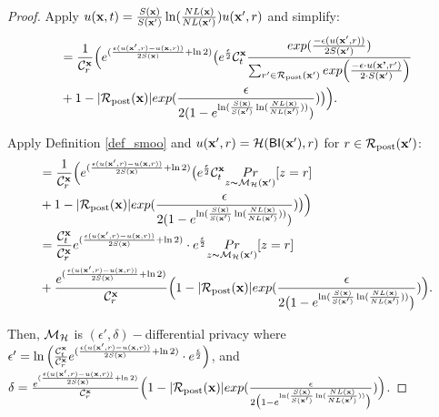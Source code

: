 \documentclass{article}
\begin{document}
\begin{proof}
      Apply $u(\textbf{x}, {t}) = \frac{S(\textbf{x})}{S(\textbf{x}')} \ln(\frac{NL(\textbf{x})}{NL(\textbf{x}')}) u(\textbf{x}', {r})$ and simplify:\\
      \begin{equation*}
      \begin{split}          
      & = \frac{1}{\mathcal{C}^{\textbf{x}}_{r}} \Big( e^{(\frac{\epsilon (u(\textbf{x}', {r}) - u(\textbf{x}, {r}))}{2 S(\textbf{x})} + \ln 2)} 
      \big( e^{\frac{\epsilon}{2}}
      \mathcal{C}^{\textbf{x}}_{t} \frac{exp(\frac{-\epsilon (u(\textbf{x}', {r}))}{2 S(\textbf{x}')})}{\sum_{r'\in \mathcal{R}_{\textup{post}}(\textbf{x}')} exp \Big(\frac{-\epsilon\cdot u(\textbf{\textbf{x}'}, r')}{2 \cdot S(\textbf{x}')}\Big)}\\
      & + 1 - |\mathcal{R}_{\textup{post}}(\textbf{x})|exp(\frac{\epsilon}{2 (1 - e ^ {\ln(\frac{S(\textbf{x})}{S(\textbf{x}')} \ln(\frac{NL(\textbf{x})}{NL(\textbf{x}')}))})}) 
      \big ) \Big).
       \end{split}
      \end{equation*}

      Apply Definition \ref{def_smoo} and $u(\textbf{x}', {r}) = \mathcal{H}(\mathsf{BI}(\textbf{x}'),r)$ for $r \in \mathcal{R}_{\textup{post}}(\textbf{x}')$:\\
      \begin{equation*}
      \begin{split}          
      & = \frac{1}{\mathcal{C}^{\textbf{x}}_{r}} \Big( e^{(\frac{\epsilon (u(\textbf{x}', {r}) - u(\textbf{x}, {r}))}{2 S(\textbf{x})} + \ln 2)} 
      \big( e^{\frac{\epsilon}{2}}
      \mathcal{C}^{\textbf{x}}_{t}  \underset{z \thicksim \mathcal{M}_{\mathcal{H}}(\textbf{x}')}{Pr}[z = r] \\
      & + 1 - |\mathcal{R}_{\textup{post}}(\textbf{x})|exp(\frac{\epsilon}{2 (1 - e ^ {\ln(\frac{S(\textbf{x})}{S(\textbf{x}')} \ln(\frac{NL(\textbf{x})}{NL(\textbf{x}')}))})}) 
      \big ) \Big)\\
      & = \frac{\mathcal{C}^{\textbf{x}}_{t}}{\mathcal{C}^{\textbf{x}}_{r}} e^{(\frac{\epsilon (u(\textbf{x}', {r}) - u(\textbf{x}, {r}))}{2 S(\textbf{x})} + \ln 2)} \cdot e^{\frac{\epsilon}{2}}
      \underset{z \thicksim \mathcal{M}_{\mathcal{H}}(\textbf{x}')}{Pr}[z = r] \\
      & + \frac{e^{(\frac{\epsilon (u(\textbf{x}', {r}) - u(\textbf{x}, {r}))}{2 S(\textbf{x})} + \ln 2)}}{\mathcal{C}^{\textbf{x}}_{r}}
      \Big( 1 - |\mathcal{R}_{\textup{post}}(\textbf{x})|exp(\frac{\epsilon}{2 \big( 1 - e ^ {\ln(\frac{S(\textbf{x})}{S(\textbf{x}')} \ln(\frac{NL(\textbf{x})}{NL(\textbf{x}')}))} \big) }) \Big).
      \end{split}
      \end{equation*}

      Then, $\mathcal{M}_{\mathcal{H}}$ is $(\epsilon', \delta)-$differential privacy where $\epsilon' = \ln \Big( \frac{\mathcal{C}^{\textbf{x}}_{t}}{\mathcal{C}^{\textbf{x}}_{r}} e^{(\frac{\epsilon (u(\textbf{x}', {r}) - u(\textbf{x}, {r}))}{2 S(\textbf{x})} + \ln 2)} \cdot e^{\frac{\epsilon}{2}} \Big)$, and
      $\delta = \frac{e^{(\frac{\epsilon (u(\textbf{x}', {r}) - u(\textbf{x}, {r}))}{2 S(\textbf{x})} + \ln 2)}}{\mathcal{C}^{\textbf{x}}_{r}}
      \Big( 1 - |\mathcal{R}_{\textup{post}}(\textbf{x})|exp(\frac{\epsilon}{2 \big(1 - e ^ {\ln(\frac{S(\textbf{x})}{S(\textbf{x}')} \ln(\frac{NL(\textbf{x})}{NL(\textbf{x}')}))}\big)}) \Big)$.



\end{proof}
\end{document}
